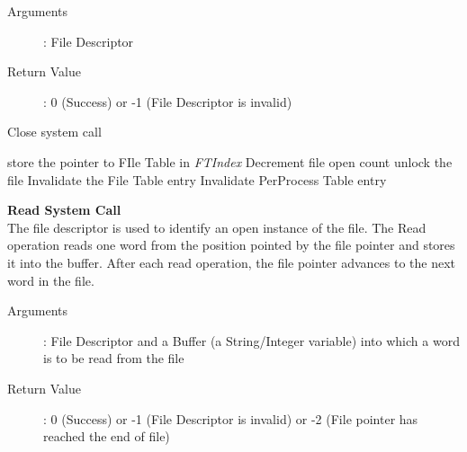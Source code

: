 \documentclass[10pt]{article}
\begin{document}
\begin{description}
	\item[Arguments]: File Descriptor
	\item[Return Value]: 0 (Success) or -1 (File Descriptor is invalid)
\end{description} 
\begin{algorithm}
\caption{Close system call}
\begin{algorithmic}
\ENDIF
{}
\ELSE 
    \STATE store the pointer to FIle Table in  \textit{FTIndex}
\ENDIF
\STATE Decrement file open count
    \STATE unlock the file
\ENDIF
{}
    \STATE Invalidate the File Table entry
    \ENDIF
\STATE Invalidate Per\-Process Table entry 
\end{algorithmic}
\end{algorithm}
\textbf{Read System Call}
\vspace{2mm}\\
The file descriptor is used to identify an open instance of the file. The Read operation reads one word from the position pointed by the file pointer and stores it into the buffer. After each read operation, the file pointer advances to the next word in the file. 
\begin{description}
	\item[Arguments]: File Descriptor and a Buffer (a String/Integer variable) into which a word is to be read from the file
	\item[Return Value]: 0 (Success) or -1 (File Descriptor is invalid) or -2 (File pointer has reached the end of file)
\end{description} 
\end{document}
